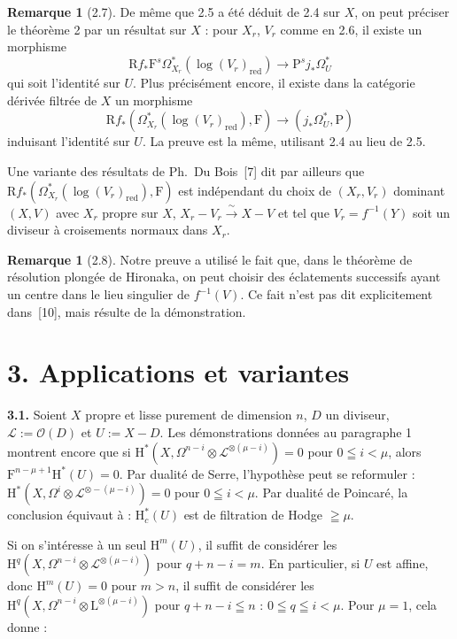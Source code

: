 \documentclass[12pt,a4paper]{article}
\theoremstyle{plain}
\theoremstyle{definition}
\newtheorem{remark}[theorem]{Remarque}
\begin{document}
\begin{remark}[2.7]
De même que 2.5 a été déduit de 2.4 sur $X$, on peut préciser le théorème 2 par un résultat sur $X$ : pour $X_r$, $V_r$ comme en 2.6, il existe un morphisme
\[
\mathrm{R}f_* \mathrm{F}^s \Omega_{X_r}^*(\log (V_r)_{\mathrm{red}}) \to \mathrm{P}^s j_* \Omega_U^*
\]
qui soit l'identité sur $U$. Plus précisément encore, il existe dans la catégorie dérivée filtrée de $X$ un morphisme
\[
\mathrm{R}f_*(\Omega_{X_r}^*(\log (V_r)_{\mathrm{red}}), \mathrm{F}) \to (j_* \Omega_U^*, \mathrm{P})
\]
induisant l'identité sur $U$. La preuve est la même, utilisant 2.4 au lieu de 2.5.

Une variante des résultats de Ph.\ Du Bois~[7] dit par ailleurs que $\mathrm{R}f_*(\Omega_{X_r}^*(\log (V_r)_{\mathrm{red}}), \mathrm{F})$ est indépendant du choix de $(X_r, V_r)$ dominant $(X, V)$ avec $X_r$ propre sur $X$, $X_r - V_r \xrightarrow{\;\sim\;} X - V$ et tel que $V_r = f^{-1}(Y)$ soit un diviseur à croisements normaux dans $X_r$.
\end{remark}

\begin{remark}[2.8]
Notre preuve a utilisé le fait que, dans le théorème de résolution plongée de Hironaka, on peut choisir des éclatements successifs ayant un centre dans le lieu singulier de $f^{-1}(V)$. Ce fait n'est pas dit explicitement dans~[10], mais résulte de la démonstration.
\end{remark}


\section*{3. Applications et variantes}

\textbf{3.1.} Soient $X$ propre et lisse purement de dimension $n$, $D$ un diviseur, $\mathscr{L} := \mathscr{O}(D)$ et $U := X - D$. Les démonstrations données au paragraphe 1 montrent encore que si $\mathrm{H}^*(X, \Omega^{n-i} \otimes \mathscr{L}^{\otimes(\mu-i)}) = 0$ pour $0 \leqq i < \mu$, alors $\mathrm{F}^{n-\mu+1} \mathrm{H}^*(U) = 0$. Par dualité de Serre, l'hypothèse peut se reformuler : $\mathrm{H}^*(X, \Omega^i \otimes \mathscr{L}^{\otimes -(\mu-i)}) = 0$ pour $0 \leqq i < \mu$. Par dualité de Poincaré, la conclusion équivaut à : $\mathrm{H}_c^*(U)$ est de filtration de Hodge $\geqq \mu$.

Si on s'intéresse à un seul $\mathrm{H}^m(U)$, il suffit de considérer les $\mathrm{H}^q(X, \Omega^{n-i} \otimes \mathscr{L}^{\otimes (\mu-i)})$ pour $q + n - i = m$. En particulier, si $U$ est affine, donc $\mathrm{H}^m(U) = 0$ pour $m > n$, il suffit de considérer les $\mathrm{H}^q(X, \Omega^{n-i} \otimes \mathrm{L}^{\otimes (\mu-i)})$ pour $q + n - i \leqq n$ : $0 \leqq q \leqq i < \mu$. Pour $\mu = 1$, cela donne :
\end{document}

